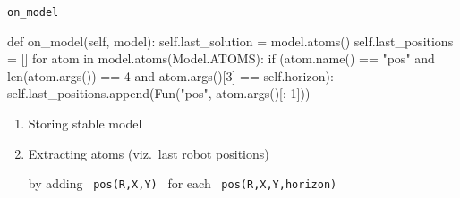 \begin{frame}[fragile]{\texttt{on\_model}}
\scriptsize
\begin{semiverbatim}
    def \alert<2>{on_model}(self, model):
        \alert<2>{self.last_solution = \alert<6>{model.atoms}()}
        \alert<3>{self.last_positions = []}
        \alert<3>{for atom in \alert<6>{model.atoms}(\alert<6>{Model.ATOMS}):}
            \alert<3>{if (\alert<6>{atom.name}() == "pos" and }
                    \alert<3>{len(\alert<6>{atom.args}()) == 4 and }
                    \alert<3>{\alert<6>{atom.args}()[3] == self.horizon):}
                \alert<3>{self.last_positions.append(\alert<6>{Fun}("pos", \alert<6>{atom.args}()[:-1]))}
\end{semiverbatim}
\normalsize
\begin{enumerate}
\item<2-> Storing stable model
\item<3-> Extracting atoms \hfill (viz.\ last robot positions)
  \par\pause[4]
  by adding \ \texttt{pos(R,X,Y)} \ for each \ \texttt{pos(R,X,Y,horizon)}
\end{enumerate}
\end{frame}
